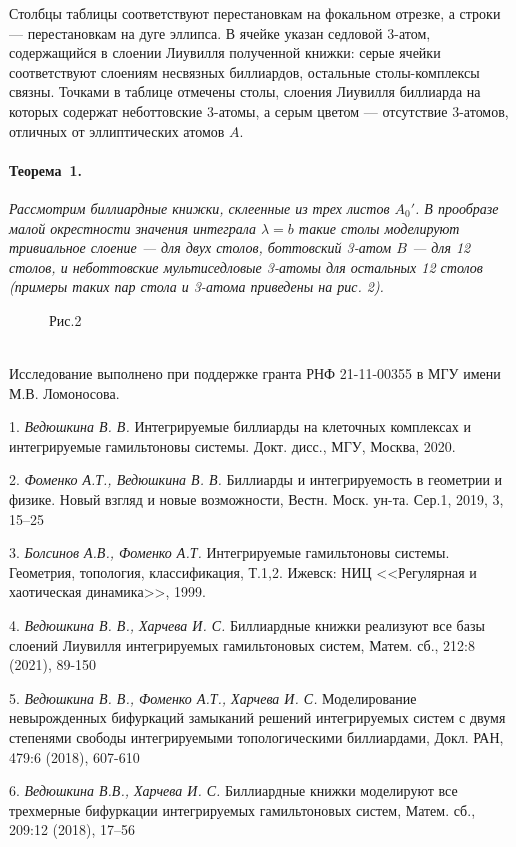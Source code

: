 Столбцы таблицы соответствуют перестановкам на фокальном отрезке, а строки --- перестановкам на дуге эллипса. В ячейке указан седловой 3-атом, содержащийся в слоении Лиувилля полученной книжки: серые ячейки соответствуют слоениям несвязных биллиардов, остальные столы-комплексы связны. Точками в таблице отмечены столы, слоения Лиувилля биллиарда на которых содержат неботтовские 3-атомы, а серым цветом --- отсутствие 3-атомов, отличных от эллиптических атомов $A$.\\

 \vspace*{-0.6cm}
\paragraph{Теорема~1.}
{\it
	Рассмотрим биллиардные книжки, склеенные из трех листов $A_0'$. В прообразе малой окрестности значения интеграла $\lambda=b$ такие столы моделируют тривиальное слоение — для двух столов, боттовский 3-атом $B$ — для 12 столов, и неботтовские мультиседловые 3-атомы для остальных 12 столов (примеры таких пар стола и 3-атома приведены на рис. 2).
}
\vspace*{-0.5cm}
\begin{figure}[h!]
\begin{minipage}[h!]{0.49\linewidth}
\end{minipage}
\begin{minipage}[h!]{0.49\linewidth}
\end{minipage}
\begin{center}
Рис.2
\end{center}
\end{figure}\\

\vspace*{-0.8cm}
Исследование выполнено при поддержке гранта РНФ 21-11-00355 в МГУ имени М.В. Ломоносова.

\litlist


1. {\it Ведюшкина В. В.}
 Интегрируемые биллиарды на клеточных комплексах и интегрируемые гамильтоновы системы. Докт. дисс., МГУ, Москва, 2020.

2. {\it Фоменко А.Т., Ведюшкина В. В.}
 Биллиарды и интегрируемость в геометрии и физике. Новый взгляд и новые возможности, Вестн. Моск. ун-та. Сер.1, 2019, 3, 15–25

3.  {\it Болсинов А.В., Фоменко А.Т.}
 Интегрируемые гамильтоновы системы. Геометрия, топология, классификация, Т.1,2. Ижевск: НИЦ <<Регулярная и хаотическая динамика>>, 1999.

4. {\it Ведюшкина В. В., Харчева И. С.}
 Биллиардные книжки реализуют все базы слоений Лиувилля интегрируемых гамильтоновых систем, Матем. сб., 212:8 (2021),  89-150

5. {\it Ведюшкина В. В., Фоменко А.Т., Харчева И. С.}
 Моделирование невырожденных бифуркаций замыканий решений интегрируемых систем с двумя степенями свободы интегрируемыми топологическими биллиардами, Докл. РАН, 479:6 (2018), 607-610

 6. {\it Ведюшкина В.В., Харчева И. С.}
 Биллиардные книжки моделируют все трехмерные бифуркации интегрируемых гамильтоновых систем, Матем. сб., 209:12 (2018), 17–56
